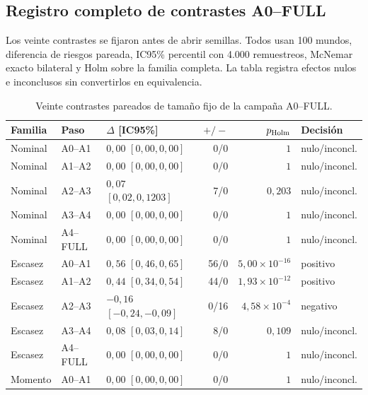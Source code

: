 \subsection*{Registro completo de contrastes A0--FULL}

Los veinte contrastes se fijaron antes de abrir semillas. Todos usan 100 mundos, diferencia
de riesgos pareada, IC95\% percentil con 4.000 remuestreos, McNemar exacto bilateral y Holm
sobre la familia completa. La tabla registra efectos nulos e inconclusos sin convertirlos
en equivalencia.

\begingroup
\scriptsize
\setlength{\tabcolsep}{3pt}
\renewcommand{\arraystretch}{1.08}
\begin{table}[H]
\centering
\scriptsize
\caption{Veinte contrastes pareados de tamaño fijo de la campaña A0--FULL.}
\label{tab:a0-full-20-contrasts}
\begin{tabular}{@{}>{\raggedright\arraybackslash}p{}>{\raggedright\arraybackslash}p{} >{\raggedright\arraybackslash}p{}r r >{\raggedright\arraybackslash}p{}@{}}
\toprule
Familia & Paso & $\Delta$ [IC95\%] & $+/-$ & $p_{\rm Holm}$ & Decisión \\
\midrule
Nominal & A0--A1 & $0{,}00$ $[0{,}00,0{,}00]$ & 0/0 & $1$ & nulo/inconcl. \\
Nominal & A1--A2 & $0{,}00$ $[0{,}00,0{,}00]$ & 0/0 & $1$ & nulo/inconcl. \\
Nominal & A2--A3 & $0{,}07$ $[0{,}02,0{,}1203]$ & 7/0 & $0{,}203$ & nulo/inconcl. \\
Nominal & A3--A4 & $0{,}00$ $[0{,}00,0{,}00]$ & 0/0 & $1$ & nulo/inconcl. \\
Nominal & A4--FULL & $0{,}00$ $[0{,}00,0{,}00]$ & 0/0 & $1$ & nulo/inconcl. \\
\midrule
Escasez & A0--A1 & $0{,}56$ $[0{,}46,0{,}65]$ & 56/0 & $5{,}00\!\times\!10^{-16}$ & positivo \\
Escasez & A1--A2 & $0{,}44$ $[0{,}34,0{,}54]$ & 44/0 & $1{,}93\!\times\!10^{-12}$ & positivo \\
Escasez & A2--A3 & $-0{,}16$ $[-0{,}24,-0{,}09]$ & 0/16 & $4{,}58\!\times\!10^{-4}$ & negativo \\
Escasez & A3--A4 & $0{,}08$ $[0{,}03,0{,}14]$ & 8/0 & $0{,}109$ & nulo/inconcl. \\
Escasez & A4--FULL & $0{,}00$ $[0{,}00,0{,}00]$ & 0/0 & $1$ & nulo/inconcl. \\
\midrule
Momento & A0--A1 & $0{,}00$ $[0{,}00,0{,}00]$ & 0/0 & $1$ & nulo/inconcl. \\

\end{tabular}
\end{table}
